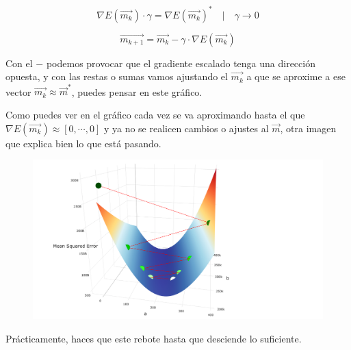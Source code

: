 \documentclass[12pt, letterpaper]{article}
\begin{document}
\[
  \nabla E(\vec{m_k}) \cdot \gamma = \nabla E(\vec{m_k})^* \quad |\quad \gamma \rightarrow 0
\]

\[
  \vec{m_{k+1}} = \vec{m_k} - \gamma \cdot \nabla E(\vec{m_k})
\]

Con el $-$ podemos provocar que el gradiente escalado tenga una dirección opuesta, y con las restas o sumas
vamos ajustando el $\vec{m_k}$ a que se aproxime a ese vector $\vec{m_k} \approx \vec{m}^*$, puedes
pensar en este gráfico.

\begin{center}
\end{center}
Como puedes ver en el gráfico cada vez se va aproximando hasta el que
$\nabla E(\vec{m_{k}}) \approx [0, \cdots, 0]$
y ya no se realicen cambios o ajustes al $\vec{m}$, otra imagen que explica bien lo que está pasando.
\begin{figure}[H]
  \centering
  \includegraphics[scale = 0.5]{gradient.png}
\end{figure}
Prácticamente, haces que este rebote hasta que desciende lo suficiente.
\end{document}
